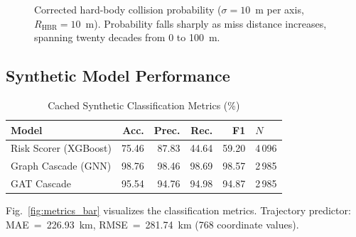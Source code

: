 \documentclass[conference]{IEEEtran}
\newcommand{\RHBR}{R_{\mathrm{HBR}}}
\begin{document}
\begin{figure}[h]
\centering
{}
\caption{Corrected hard-body collision probability ($\sigma=10$~m per axis,
$\RHBR=10$~m). Probability falls sharply as miss distance increases, spanning
twenty decades from 0 to 100~m.}
\label{fig:pc_vs_miss}
\end{figure}

\subsection{Synthetic Model Performance}

\begin{table}[h]
\caption{Cached Synthetic Classification Metrics (\%)}
\label{tab:metrics}
\centering
\footnotesize
\begin{tabular}{@{}lrrrrl@{}}
\toprule
\textbf{Model} & \textbf{Acc.} & \textbf{Prec.} & \textbf{Rec.} & \textbf{F1} & \textbf{$N$} \\
\midrule
Risk Scorer (XGBoost) & 75.46 & 87.83 & 44.64 & 59.20 & 4\,096 \\
Graph Cascade (GNN)   & 98.76 & 98.46 & 98.69 & 98.57 & 2\,985 \\
GAT Cascade           & 95.54 & 94.76 & 94.98 & 94.87 & 2\,985 \\
\bottomrule
\end{tabular}
\end{table}

Fig.~\ref{fig:metrics_bar} visualizes the classification metrics. Trajectory
predictor: MAE~=~226.93~km, RMSE~=~281.74~km (768 coordinate values).
\end{document}
